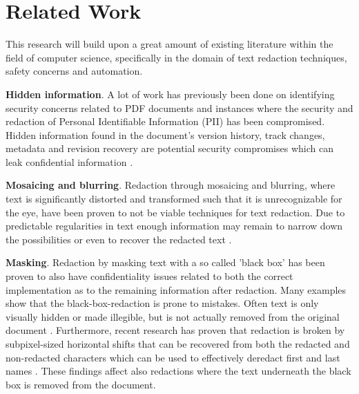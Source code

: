 \section{Related Work}
\label{sec:related_work}

This research will build upon a great amount of existing literature within the field of computer science, specifically in the domain of text redaction techniques, safety concerns and automation. 

\textbf{Hidden information}. A lot of work has previously been done on identifying security concerns related to PDF documents and instances where the security and redaction of Personal Identifiable Information (PII) has been compromised. Hidden information found in the document's version history, track changes, metadata and revision recovery are potential security compromises which can leak confidential information \cite{muller2021processing} \cite{forrester2005investigation} \cite{govAu2017}.

\textbf{Mosaicing and blurring}.
Redaction through mosaicing and blurring, where text is significantly distorted and transformed such that it is unrecognizable for the eye, have been proven to not be viable techniques for text redaction. Due to predictable regularities in text enough information may remain to narrow down the possibilities or even to recover the redacted text \cite{hill2016effectiveness}. 

\textbf{Masking}.
Redaction by masking text with a so called 'black box' has been proven to also have confidentiality issues related to both the correct implementation as to the remaining information after redaction. Many examples show that the black-box-redaction is prone to mistakes. Often text is only visually hidden or made illegible, but is not actually removed from the original document \cite{national2005redacting} \cite{bland2022story}. Furthermore, recent research has proven that redaction is broken by subpixel-sized horizontal shifts that can be recovered from both the redacted and non-redacted characters which can be used to effectively deredact first and last names \cite{bland2022story}. These findings affect also redactions where the text underneath the black box is removed from the document. 


